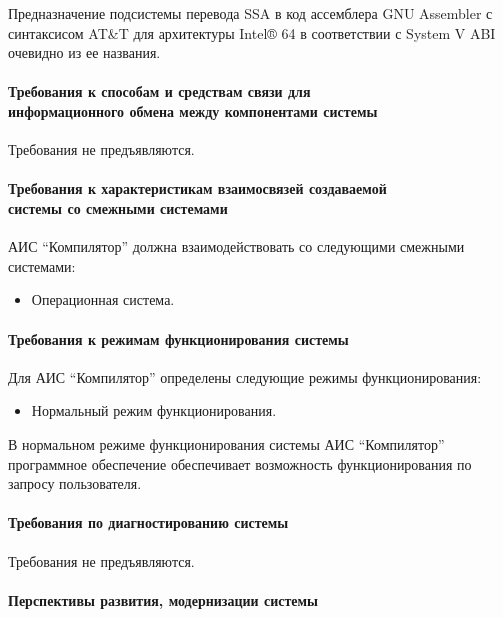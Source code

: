 \documentclass[14pt,russian]{extarticle}
\begin{document}
Предназначение подсистемы перевода SSA в код ассемблера GNU Assembler с
синтаксисом AT\&T для архитектуры Intel® 64 в соответствии с System V ABI
очевидно из ее названия.

\paragraph{Требования к способам и средствам связи для\\информационного
обмена между компонентами системы}

Требования не предъявляются.

\paragraph{Требования к характеристикам взаимосвязей создаваемой\\системы
со смежными системами}

АИС \enquote{Компилятор} должна взаимодействовать со следующими смежными системами:

\begin{itemize}
	\item Операционная система.
\end{itemize}

\paragraph{Требования к режимам функционирования системы}

Для АИС \enquote{Компилятор} определены следующие режимы функционирования:

\begin{itemize}
	\item Нормальный режим функционирования.
\end{itemize}

В нормальном режиме функционирования системы АИС \enquote{Компилятор} программное
обеспечение обеспечивает возможность функционирования по запросу пользователя.

\paragraph{Требования по диагностированию системы}

Требования не предъявляются.

\paragraph{Перспективы развития, модернизации системы}
\end{document}

